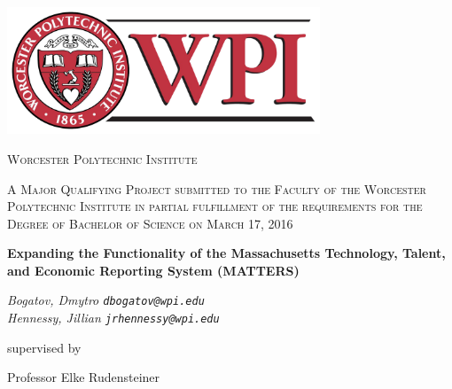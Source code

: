 \begin{titlepage}
	\centering
	
    \includegraphics[width=0.7\textwidth]{images/wpiLogo.png}\par\vspace{0.5cm}
	
    {\scshape\Large Worcester Polytechnic Institute \par}
	\vspace{1cm}
	
    {\scshape\large
		A Major Qualifying Project submitted to the Faculty of the 
		Worcester Polytechnic Institute in partial fulfillment of 
		the requirements for the Degree of Bachelor of Science on March 17, 2016 
	\par}
	\vspace{1.25cm}
	
    {\LARGE\bfseries Expanding the Functionality of the Massachusetts Technology, Talent, and Economic Reporting System (MATTERS) \par}
	\vspace{1cm}
	
    {\large\itshape 
        Bogatov, Dmytro \texttt{dbogatov@wpi.edu} \\
        Hennessy, Jillian \texttt{jrhennessy@wpi.edu}
     \par}
	\vfill
	
    supervised by\par
	Professor Elke Rudensteiner

	\vfill
    
\end{titlepage}